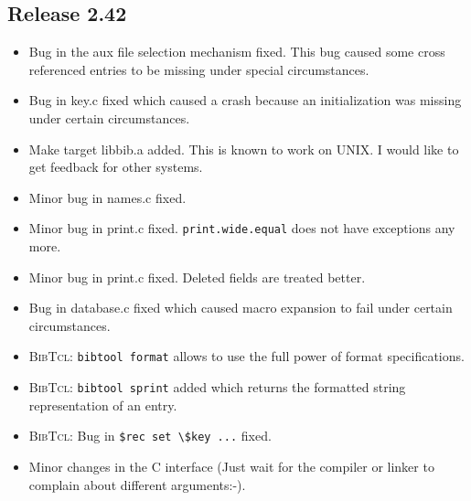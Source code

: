\documentclass[11pt,a4paper]{scrartcl}
\newcommand\rsc[1]{\texttt{#1}}
\newcommand\File[1]{\textsf{#1}}
\newcommand\BibTcl{\textsc{BibTcl}}
\newenvironment{Release}[2]{%
  \def\tmp{#2}%
  \section*{Release #1 \ifx\tmp\empty\else{\normalsize[#2]}\fi}
  \begin{itemize}
}{\end{itemize}}
\newenvironment{Fix}[1]{\item }{}
\newenvironment{New}[1]{\item }{}
\newenvironment{Update}[1]{\item }{}
\begin{document}
\begin{multicols}
\begin{Release}{2.42}{}
  \begin{Fix}{gene}
    Bug in the aux file selection mechanism fixed. This bug caused some cross
    referenced entries to be missing under special circumstances.
  \end{Fix}
  \begin{Fix}{gene}
    Bug in \File{key.c} fixed which caused a crash because an
    initialization was missing under certain circumstances.
  \end{Fix}
  \begin{New}{gene}
    Make target \File{libbib.a} added. This is known to work on UNIX. I would
    like to get feedback for other systems.
  \end{New}
  \begin{Fix}{gene}
    Minor bug in \File{names.c} fixed.
  \end{Fix}
  \begin{Fix}{gene}
    Minor bug in \File{print.c} fixed. \rsc{print.wide.equal} does not
    have exceptions any more.
  \end{Fix}
  \begin{Fix}{gene}
    Minor bug in \File{print.c} fixed. Deleted fields are treated better.
  \end{Fix}
  \begin{Fix}{gene}
    Bug in \File{database.c} fixed which caused macro expansion to fail under
    certain circumstances.
  \end{Fix}
  \begin{Update}{gene}
    \BibTcl: \verb|bibtool format| allows to use the full power of
    format specifications.
  \end{Update}
  \begin{New}{gene}
    \BibTcl: \verb|bibtool sprint| added which returns the formatted
    string representation of an entry.
  \end{New}
  \begin{Fix}{gene}
    \BibTcl: Bug in \verb|$rec set \$key ...| fixed.
  \end{Fix}
  \begin{Update}{gene}
    Minor changes in the C interface (Just wait for the compiler or
    linker to complain about different arguments:-).
  \end{Update}
 \end{Release}


\end{multicols}
\end{document}
